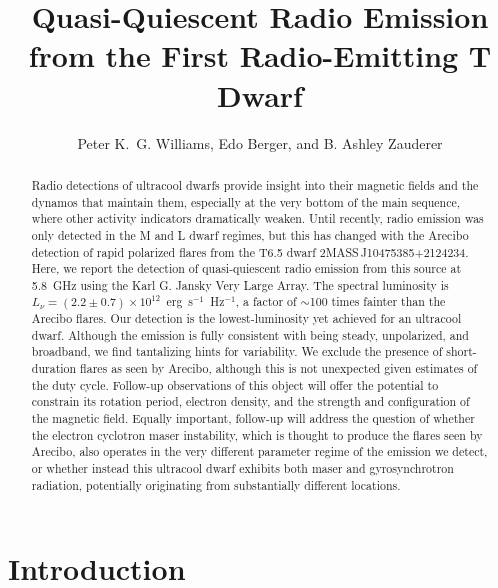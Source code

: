 \documentclass[iop]{emulateapj}
\newcommand\apx{\ensuremath{\sim}}
\begin{document}
\title{Quasi-Quiescent Radio Emission from the First Radio-Emitting T Dwarf}
\author{
  Peter K.~G. Williams,
  Edo Berger,
  and
  B. Ashley Zauderer
}

\begin{abstract}
  Radio detections of ultracool dwarfs provide insight into their magnetic
  fields and the dynamos that maintain them, especially at the very bottom of
  the main sequence, where other activity indicators dramatically weaken.
  Until recently, radio emission was only detected in the M and L dwarf
  regimes, but this has changed with the Arecibo detection of rapid polarized
  flares from the T6.5 dwarf 2MASS\,J10475385+2124234. Here, we report the
  detection of quasi-quiescent radio emission from this source at 5.8~GHz
  using the Karl G. Jansky Very Large Array. The spectral luminosity is $L_\nu
  = (2.2 \pm 0.7) \times 10^{12}$~erg~s$^{-1}$~Hz$^{-1}$, a factor of \apx100
  times fainter than the Arecibo flares. Our detection is the
  lowest-luminosity yet achieved for an ultracool dwarf. Although the emission
  is fully consistent with being steady, unpolarized, and broadband, we find
  tantalizing hints for variability. We exclude the presence of short-duration
  flares as seen by Arecibo, although this is not unexpected given estimates
  of the duty cycle. Follow-up observations of this object will offer the
  potential to constrain its rotation period, electron density, and the
  strength and configuration of the magnetic field. Equally important,
  follow-up will address the question of whether the electron cyclotron maser
  instability, which is thought to produce the flares seen by Arecibo, also
  operates in the very different parameter regime of the emission we detect,
  or whether instead this ultracool dwarf exhibits both maser and
  gyrosynchrotron radiation, potentially originating from substantially
  different locations.
\end{abstract}


\newcommand\rw{\citetalias{rw12}}

\section{Introduction}
\label{s.intro}
\end{document}
